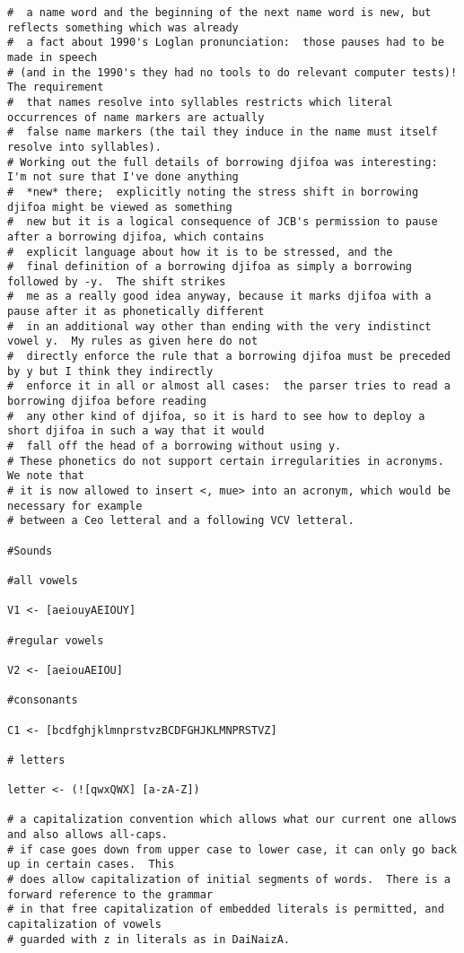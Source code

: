 \documentclass[12pt]{book}
\begin{document}
{\begin{verbatim}
#  a name word and the beginning of the next name word is new, but reflects something which was already
#  a fact about 1990's Loglan pronunciation:  those pauses had to be made in speech
# (and in the 1990's they had no tools to do relevant computer tests)!  The requirement
#  that names resolve into syllables restricts which literal occurrences of name markers are actually
#  false name markers (the tail they induce in the name must itself resolve into syllables).
# Working out the full details of borrowing djifoa was interesting:  I'm not sure that I've done anything
#  *new* there;  explicitly noting the stress shift in borrowing djifoa might be viewed as something
#  new but it is a logical consequence of JCB's permission to pause after a borrowing djifoa, which contains
#  explicit language about how it is to be stressed, and the
#  final definition of a borrowing djifoa as simply a borrowing followed by -y.  The shift strikes
#  me as a really good idea anyway, because it marks djifoa with a pause after it as phonetically different
#  in an additional way other than ending with the very indistinct vowel y.  My rules as given here do not
#  directly enforce the rule that a borrowing djifoa must be preceded by y but I think they indirectly
#  enforce it in all or almost all cases:  the parser tries to read a borrowing djifoa before reading
#  any other kind of djifoa, so it is hard to see how to deploy a short djifoa in such a way that it would
#  fall off the head of a borrowing without using y.
# These phonetics do not support certain irregularities in acronyms.  We note that
# it is now allowed to insert <, mue> into an acronym, which would be necessary for example
# between a Ceo letteral and a following VCV letteral.

#Sounds

#all vowels

V1 <- [aeiouyAEIOUY]

#regular vowels

V2 <- [aeiouAEIOU]

#consonants

C1 <- [bcdfghjklmnprstvzBCDFGHJKLMNPRSTVZ]

# letters

letter <- (![qwxQWX] [a-zA-Z])

# a capitalization convention which allows what our current one allows and also allows all-caps.
# if case goes down from upper case to lower case, it can only go back up in certain cases.  This
# does allow capitalization of initial segments of words.  There is a forward reference to the grammar
# in that free capitalization of embedded literals is permitted, and capitalization of vowels
# guarded with z in literals as in DaiNaizA.


\end{verbatim}}
\end{document}
